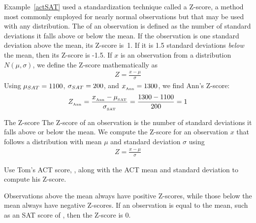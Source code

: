 Example~\ref{actSAT} used a standardization technique called
a Z-score, a method most commonly employed for nearly normal
observations but that may be used with any distribution.
The  of an observation is defined
as the number of standard deviations it falls above or below
the mean.
If the observation is one standard deviation above the mean,
its Z-score is~1.
If it is 1.5 standard deviations \emph{below} the mean,
then its Z-score is -1.5.
If $x$ is an observation from a distribution $N(\mu, \sigma)$,
we define the Z-score mathematically as
\begin{align*}
Z = \frac{x - \mu}{\sigma}
\end{align*}
Using $\mu_{SAT} = 1100{}$, $\sigma_{SAT} = 200{}$,
and $x_{_{\text{Ann}}} = 1300{}$, we find Ann's Z-score:
\begin{align*}
Z_{_{\text{Ann}}}
  = \frac{x_{_{\text{Ann}}} - \mu_{_{\text{SAT}}}}
      {\sigma_{_{\text{SAT}}}}
  = \frac{1300{} - 1100{}}{200{}}
  = 1{}
\end{align*}

\begin{onebox}{The Z-score}
  The Z-score of an observation is the number of standard
  deviations it falls above or below the mean.
  We compute the Z-score for an observation $x$ that follows
  a distribution with mean $\mu$ and standard deviation
  $\sigma$ using
  \begin{align*}
  Z = \frac{x - \mu}{\sigma}
  \end{align*}
\end{onebox}

\begin{exercisewrap}
\begin{nexercise}
Use Tom's ACT score, \tomsatscore{}, along with the ACT mean and
standard deviation to compute his Z-score.\footnotemark{}
\end{nexercise}
\end{exercisewrap}

Observations above the mean always have positive Z-scores,
while those below the mean always have negative Z-scores.
If an observation is equal to the mean,
such as an SAT score of \satmean{}, then the Z-score is $0$.

